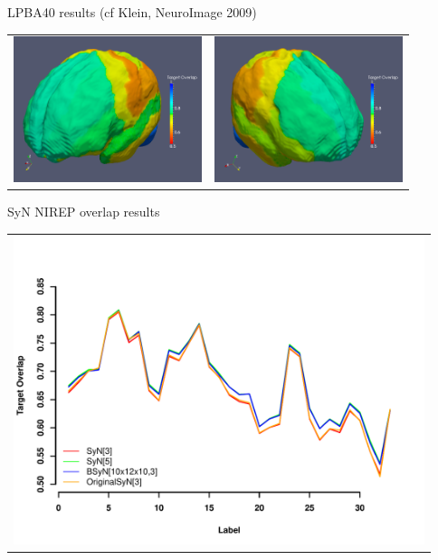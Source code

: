 \documentclass[xcolor=dvipsnames,serif,10pt]{beamer}
\begin{document}
\begin{frame}{LPBA40 results (cf Klein, NeuroImage 2009)}


\begin{center}
\begin{tabular}{cc}
  \includegraphics[width=55mm]{../Figures/leftHemisphere.png} &
  \includegraphics[width=55mm]{../Figures/rightHemisphere.png}
\end{tabular}
\end{center}

\end{frame}


\begin{frame}{SyN NIREP overlap results}

\begin{center}
\vspace*{-16mm}
\begin{tabular}{c}
  \includegraphics[width=120mm]{../WBIRStudy/SyNLabelOverlapNIREP.pdf}
\end{tabular}
\end{center}

\end{frame}
\end{document}
